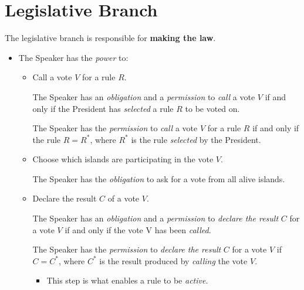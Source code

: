 \section{Legislative Branch}
\label{sec:legislative}
The legislative branch is responsible for \textbf{making the law}.
\begin{itemize}

    \item The Speaker has the \emph{power} to:
    \begin{itemize}

        \item Call a vote $V$ for a rule $R$.
        \begin{rule_IIGO}\label{rule:call_vote_obl}
            The Speaker has an \emph{obligation} and a \emph{permission} to \emph{call} a vote $V$ if and only if the President has \emph{selected} a rule $R$ to be voted on.
        \end {rule_IIGO}
        \begin{rule_IIGO} \label{rule:call_vote_perm}
            The Speaker has the \emph{permission} to \emph{call} a vote $V$ for a rule $R$ if and only if the rule $R = R^{*}$, where $R^{*}$ is the rule \emph{selected} by the President.
        \end {rule_IIGO}

        \item Choose which islands are participating in the vote $V$.
        \begin{rule_IIGO} \label{rule:all_islands_vote}
            The Speaker has the \emph{obligation} to ask for a vote from all alive islands.
        \end {rule_IIGO}

        \item Declare the result $C$ of a vote $V$.
        \begin{rule_IIGO}
            The Speaker has an \emph{obligation} and a \emph{permission} to \emph{declare the result} $C$ for a vote $V$ if and only if the vote V has been \emph{called}.
        \end {rule_IIGO}
        \begin{rule_IIGO}
            The Speaker has the \emph{permission} to \emph{declare the result} $C$ for a vote $V$ if $C = C^{*}$, where $C^{*}$ is the result produced by \emph{calling} the vote $V$.
        \end {rule_IIGO}
        \begin{itemize}
            \item This step is what enables a rule to be \emph{active}.
        \end{itemize}
    \end{itemize}
\end{itemize}




